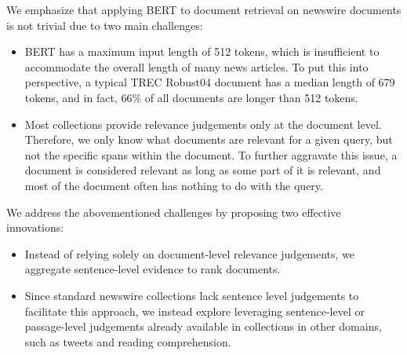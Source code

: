 We emphasize that applying BERT to document retrieval on newswire documents is not trivial due to two main challenges:\

\begin{itemize}
	\item
	BERT has a maximum input length of 512 tokens, which is insufficient to accommodate the overall length of many news articles.
	To put this into perspective, a typical TREC Robust04 document has a median length of 679 tokens, and in fact, 66\% of all documents are longer than 512 tokens.
	\item
	Most collections provide relevance judgements only at the document level.
	Therefore, we only know what documents are relevant for a given query, but not the specific spans within the document.
	To further aggravate this issue, a document is considered relevant as long as some part of it is relevant, and most of the document often has nothing to do with the query.
\end{itemize}


We address the abovementioned challenges by proposing two effective innovations:\

\begin{itemize}
	\item
	Instead of relying solely on document-level relevance judgements, we aggregate sentence-level evidence to rank documents.
	\item
	Since standard newswire collections lack sentence level judgements to facilitate this approach, we instead explore leveraging sentence-level or passage-level judgements already available in collections in other domains, such as tweets and reading comprehension.
\end{itemize}


